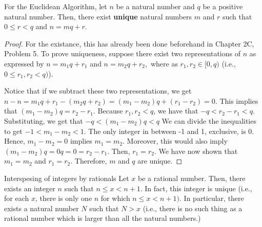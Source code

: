 \begin{lemma}\label{lem: euclidean}
    For the Euclidean Algorithm, let $n$ be a natural number and $q$ be a positive natural number. 
    Then, there exist \textbf{unique} natural numbers $m$ and $r$ such that $0 \leq r < q$ and $n = mq + r$.
\end{lemma}
\begin{proof}
    For the existance, this has already been done beforehand in Chapter 2C, Problem 5.
    To prove uniqueness, suppose there exist two representations of $n$ as expressed by $n = m_1 q + r_1$ and $n = m_2 q + r_2,$
    where as $r_1, r_2 \in [0, q)$ (i.e., $0 \leq r_1, r_2 < q)$).

    Notice that if we subtract these two representations, we get $n - n= m_1 q + r_1 - (m_2 q + r_2) = (m_1 - m_2) q + (r_1 - r_2) = 0.$
    This implies that $(m_1 - m_2) q = r_2 - r_1.$ 
    Because $r_1, r_2 < q$, we have that $-q < r_2 - r_1 < q$.
    Substituting, we get that $-q < (m_1 - m_2) q < q$
    We can divide the inequalities to get $-1 < m_1 - m_2 < 1.$
    The only integer in between -1 and 1, exclusive, is 0.
    Hence, $m_1 - m_2 = 0$ implies $m_1 = m_2$.
    Moreover, this would also imply $(m_1 - m_2)q = 0q = 0 = r_2 - r_1.$ Then, $r_1 = r_2.$
    We have now shown that $m_1 = m_2$ and $r_1 = r_2.$ Therefore, $m$ and $q$ are unique. 


\end{proof}

\begin{problem}{Interspesing of integers by rationals}
    Let $x$ be a rational number. 
    Then, there exists an integer $n$ such that $n \leq x < n + 1.$
    In fact, this integer is unique (i.e., for each $x$, there is only one $n$ for which $n \leq x < n + 1)$.
    In particular, there exists a natural number $N$ such that $N > x$ (i.e., there is no such thing as a rational number which is larger than all the natural numbers.)
\end{problem}

